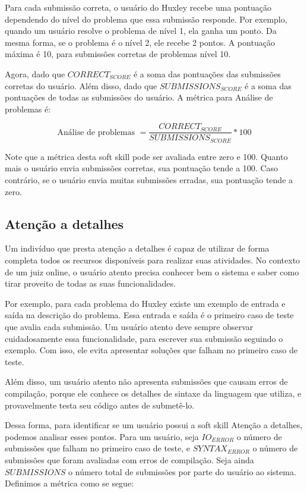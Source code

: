 Para cada submissão correta, o usuário do Huxley recebe uma pontuação dependendo do nível do problema que essa submissão responde. Por exemplo, quando um usuário resolve o problema de nível 1, ela ganha um ponto. Da mesma forma, se o problema é o nível 2, ele recebe 2 pontos. A pontuação máxima é 10, para submissões corretas de problemas nível 10.

Agora, dado que $CORRECT_{SCORE}$ é a soma das pontuações das submissões corretas do usuário. Além disso, dado que $SUBMISSIONS_{SCORE}$ é a soma das pontuações de todas as submissões do usuário. A métrica para Análise de problemas é:

\begin{equation} \label{m:analise}
\mbox{Análise de problemas } = \frac{CORRECT_{SCORE}}{SUBMISSIONS_{SCORE}} * 100
\end{equation}

Note que a métrica desta soft skill pode ser avaliada entre zero e 100. Quanto mais o usuário envia submissões corretas, sua pontuação tende a 100. Caso contrário, se o usuário envia muitas submissões erradas, sua pontuação tende a zero.

\subsection{Atenção a detalhes}

Um indivíduo que presta atenção a detalhes é capaz de utilizar de forma completa todos os recursos disponíveis para realizar suas atividades. No contexto de um juiz online, o usuário atento precisa conhecer bem o sistema e saber como tirar proveito de todas as suas funcionalidades.

Por exemplo, para cada problema do Huxley existe um exemplo de entrada e saída na descrição do problema. Essa entrada e saída é o primeiro caso de teste que avalia cada submissão. Um usuário atento deve sempre observar cuidadosamente essa funcionalidade, para escrever sua submissão seguindo o exemplo. Com isso, ele evita apresentar soluções que falham no primeiro caso de teste.

Além disso, um usuário atento não apresenta submissões que causam erros de compilação, porque ele conhece os detalhes de sintaxe da linguagem que utiliza, e provavelmente testa seu código antes de submetê-lo.

Dessa forma, para identificar se um usuário possui a soft skill Atenção a detalhes, podemos analisar esses pontos. Para um usuário, seja $IO_{ERROR}$ o número de submissões que falham no primeiro caso de teste, e $SYNTAX_{ERROR}$ o número de submissões que foram avaliadas com erros de compilação. Seja ainda $SUBMISSIONS$ o número total de submissões por parte do usuário ao sistema. Definimos a métrica como se segue:

